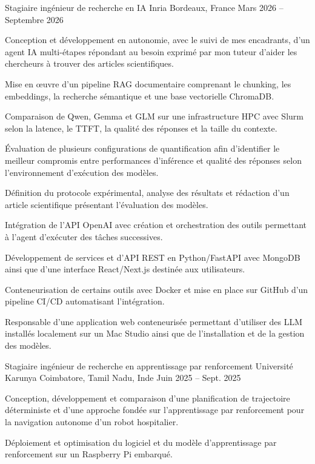 
\begin{cventries}
  \cventry
    {Stagiaire ingénieur de recherche en IA}
    {Inria}
    {Bordeaux, France}
    {Mars 2026 -- Septembre 2026}
    {
      \begin{cvitems}
        \item {Conception et développement en autonomie, avec le suivi de mes encadrants, d’un agent IA multi-étapes répondant au besoin exprimé par mon tuteur d’aider les chercheurs à trouver des articles scientifiques.}
        \item {Mise en œuvre d’un pipeline RAG documentaire comprenant le chunking, les embeddings, la recherche sémantique et une base vectorielle ChromaDB.}
        \item {Comparaison de Qwen, Gemma et GLM sur une infrastructure HPC avec Slurm selon la latence, le TTFT, la qualité des réponses et la taille du contexte.}
        \item {Évaluation de plusieurs configurations de quantification afin d’identifier le meilleur compromis entre performances d’inférence et qualité des réponses selon l’environnement d’exécution des modèles.}
        \item {Définition du protocole expérimental, analyse des résultats et rédaction d’un article scientifique présentant l’évaluation des modèles.}
        \item {Intégration de l’API OpenAI avec création et orchestration des outils permettant à l’agent d’exécuter des tâches successives.}
        \item {Développement de services et d’API REST en Python/FastAPI avec MongoDB ainsi que d’une interface React/Next.js destinée aux utilisateurs.}
        \item {Conteneurisation de certains outils avec Docker et mise en place sur GitHub d’un pipeline CI/CD automatisant l’intégration.}
        \item {Responsable d’une application web conteneurisée permettant d’utiliser des LLM installés localement sur un Mac Studio ainsi que de l’installation et de la gestion des modèles.}
      \end{cvitems}
    }

  \cventry
    {Stagiaire ingénieur de recherche en apprentissage par renforcement}
    {Université Karunya}
    {Coimbatore, Tamil Nadu, Inde}
    {Juin 2025 -- Sept. 2025}
    {
      \begin{cvitems}
        \item {Conception, développement et comparaison d’une planification de trajectoire déterministe et d’une approche fondée sur l’apprentissage par renforcement pour la navigation autonome d’un robot hospitalier.}
        \item {Déploiement et optimisation du logiciel et du modèle d’apprentissage par renforcement sur un Raspberry Pi embarqué.}
      \end{cvitems}
    }
\end{cventries}
